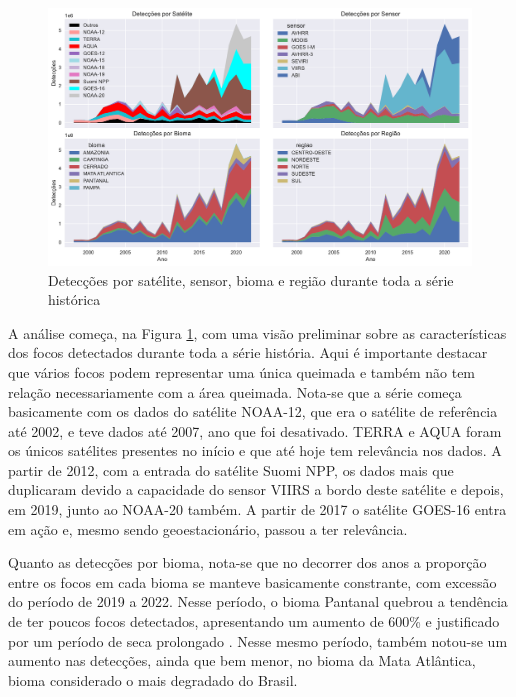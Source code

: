\documentclass[cic,tc]{iiufrgs}
\begin{document}
\begin{figure}[H]
    \caption{Detecções por satélite, sensor, bioma e região durante toda a série histórica}
    \begin{center}
        \includegraphics[width=35em]{medicoes_nos_anos}
    \end{center}
    \label{fig:medicoes_nos_anos}
\end{figure}

A análise começa, na Figura \ref{fig:medicoes_nos_anos}, com uma visão preliminar sobre as características dos focos detectados durante toda a série história. Aqui é importante destacar que vários focos podem representar uma única queimada e também não tem relação necessariamente com a área queimada. Nota-se que a série começa basicamente com os dados do satélite NOAA-12, que era o satélite de referência até 2002, e teve dados até 2007, ano que foi desativado. TERRA e AQUA foram os únicos satélites presentes no início e que até hoje tem relevância nos dados. A partir de 2012, com a entrada do satélite Suomi NPP, os dados mais que duplicaram devido a capacidade do sensor VIIRS a bordo deste satélite e depois, em 2019, junto ao NOAA-20 também. A partir de 2017 o satélite GOES-16 entra em ação e, mesmo sendo geoestacionário, passou a ter relevância. \par

Quanto as detecções por bioma, nota-se que no decorrer dos anos a proporção entre os focos em cada bioma se manteve basicamente constrante, com excessão do período de 2019 a 2022. Nesse período, o bioma Pantanal quebrou a tendência de ter poucos focos detectados, apresentando um aumento de 600\% e justificado por um período de seca prolongado \cite{pantanal2021dinamica}. Nesse mesmo período, também notou-se um aumento nas detecções, ainda que bem menor, no bioma da Mata Atlântica, bioma considerado o mais degradado do Brasil. \par
\end{document}
